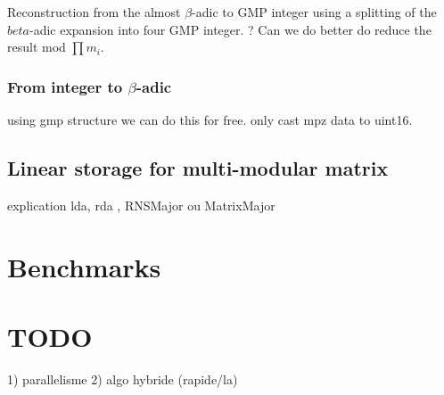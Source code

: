 \documentclass[acmtoms,acmnow]{acmtrans2m}
\begin{document}
Reconstruction from the almost $\beta$-adic to GMP integer using a splitting of
the $beta$-adic expansion into four GMP integer. ? Can we do better do reduce the
result mod $\prod m_i$.

\subsubsection{From integer to $\beta$-adic}
using gmp structure we can do this for free. only cast mpz data to uint16.

\subsection{Linear storage for multi-modular matrix}
explication lda, rda , RNSMajor ou MatrixMajor
\section{Benchmarks}


\section{TODO}
1) parallelisme 2) algo hybride (rapide/la)



 
\end{document}
